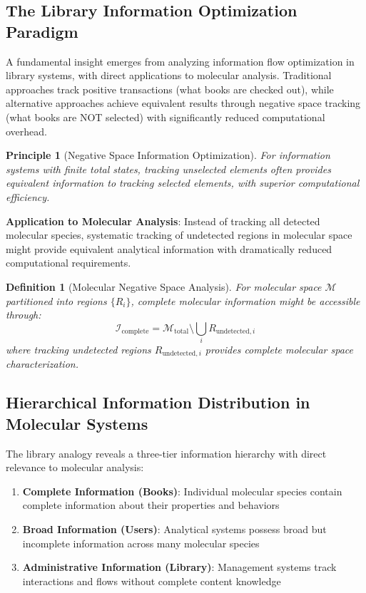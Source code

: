 \documentclass[11pt,a4paper]{article}
\newtheorem{definition}[theorem]{Definition}
\newtheorem{principle}[theorem]{Principle}
\theoremstyle{remark}
\begin{document}
\subsection{The Library Information Optimization Paradigm}

A fundamental insight emerges from analyzing information flow optimization in library systems, with direct applications to molecular analysis. Traditional approaches track positive transactions (what books are checked out), while alternative approaches achieve equivalent results through negative space tracking (what books are NOT selected) with significantly reduced computational overhead.

\begin{principle}[Negative Space Information Optimization]
For information systems with finite total states, tracking unselected elements often provides equivalent information to tracking selected elements, with superior computational efficiency.
\end{principle}

\textbf{Application to Molecular Analysis}: Instead of tracking all detected molecular species, systematic tracking of undetected regions in molecular space might provide equivalent analytical information with dramatically reduced computational requirements.

\begin{definition}[Molecular Negative Space Analysis]
For molecular space $\mathcal{M}$ partitioned into regions $\{R_i\}$, complete molecular information might be accessible through:
$$\mathcal{I}_{\text{complete}} = \mathcal{M}_{\text{total}} \setminus \bigcup_{i} R_{\text{undetected},i}$$
where tracking undetected regions $R_{\text{undetected},i}$ provides complete molecular space characterization.
\end{definition}

\subsection{Hierarchical Information Distribution in Molecular Systems}

The library analogy reveals a three-tier information hierarchy with direct relevance to molecular analysis:

\begin{enumerate}
\item \textbf{Complete Information (Books)}: Individual molecular species contain complete information about their properties and behaviors
\item \textbf{Broad Information (Users)}: Analytical systems possess broad but incomplete information across many molecular species  
\item \textbf{Administrative Information (Library)}: Management systems track interactions and flows without complete content knowledge
\end{enumerate}
\end{document}

